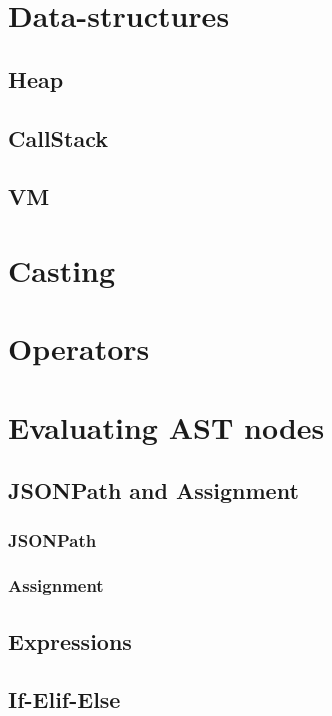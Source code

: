 \documentclass[]{full}
\theoremstyle{definition}
\begin{document}
\section{Data-structures}

\subsection{Heap}

\subsection{CallStack}

\subsection{VM}

\section{Casting}

\section{Operators}

\section{Evaluating AST nodes}

\subsection{JSONPath and Assignment}

\subsubsection{JSONPath}

\subsubsection{Assignment}

\subsection{Expressions}

\subsection{If-Elif-Else}
\end{document}
